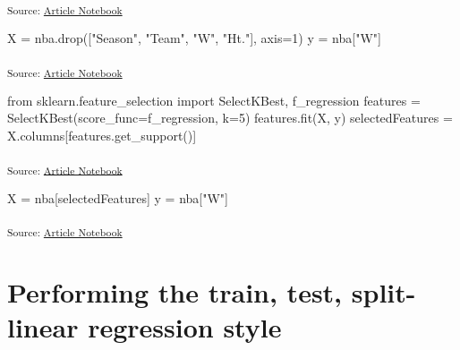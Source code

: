 \documentclass[
  a4paper,
  DIV=11,
  numbers=noendperiod]{scrreprt}
\newenvironment{Shaded}{\begin{snugshade}}{\end{snugshade}}
\newcommand{\DecValTok}[1]{\textcolor[rgb]{0.68,0.00,0.00}{#1}}
\newcommand{\ImportTok}[1]{\textcolor[rgb]{0.00,0.46,0.62}{#1}}
\newcommand{\NormalTok}[1]{\textcolor[rgb]{0.00,0.23,0.31}{#1}}
\newcommand{\OperatorTok}[1]{\textcolor[rgb]{0.37,0.37,0.37}{#1}}
\newcommand{\StringTok}[1]{\textcolor[rgb]{0.13,0.47,0.30}{#1}}
\begin{document}
\textsubscript{Source:
\href{https://sigmadream.github.io/practice-quarto/NBA_2023-24.ipynb.html}{Article
Notebook}}

\begin{Shaded}
\begin{Highlighting}[]
\NormalTok{X }\OperatorTok{=}\NormalTok{ nba.drop([}\StringTok{"Season"}\NormalTok{, }\StringTok{"Team"}\NormalTok{, }\StringTok{"W"}\NormalTok{, }\StringTok{"Ht."}\NormalTok{], axis}\OperatorTok{=}\DecValTok{1}\NormalTok{)}
\NormalTok{y }\OperatorTok{=}\NormalTok{ nba[}\StringTok{"W"}\NormalTok{]}
\end{Highlighting}
\end{Shaded}

\textsubscript{Source:
\href{https://sigmadream.github.io/practice-quarto/NBA_2023-24.ipynb.html}{Article
Notebook}}

\begin{Shaded}
\begin{Highlighting}[]
\ImportTok{from}\NormalTok{ sklearn.feature\_selection }\ImportTok{import}\NormalTok{ SelectKBest, f\_regression}
\NormalTok{features }\OperatorTok{=}\NormalTok{ SelectKBest(score\_func}\OperatorTok{=}\NormalTok{f\_regression, k}\OperatorTok{=}\DecValTok{5}\NormalTok{)}
\NormalTok{features.fit(X, y)}
\NormalTok{selectedFeatures }\OperatorTok{=}\NormalTok{ X.columns[features.get\_support()]}
\end{Highlighting}
\end{Shaded}

\textsubscript{Source:
\href{https://sigmadream.github.io/practice-quarto/NBA_2023-24.ipynb.html}{Article
Notebook}}

\begin{Shaded}
\begin{Highlighting}[]
\NormalTok{X }\OperatorTok{=}\NormalTok{ nba[selectedFeatures]}
\NormalTok{y }\OperatorTok{=}\NormalTok{ nba[}\StringTok{"W"}\NormalTok{]}
\end{Highlighting}
\end{Shaded}

\textsubscript{Source:
\href{https://sigmadream.github.io/practice-quarto/NBA_2023-24.ipynb.html}{Article
Notebook}}

\chapter{Performing the train, test, split-linear regression
style}\label{performing-the-train-test-split-linear-regression-style}
\end{document}

